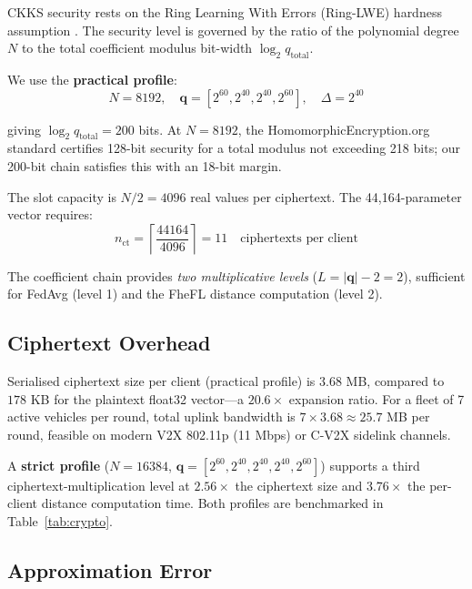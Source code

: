 \documentclass[conference]{IEEEtran}
\begin{document}
CKKS security rests on the Ring Learning With Errors (Ring-LWE) hardness
assumption \cite{lyubashevsky2010ideal}. The security level is governed by
the ratio of the polynomial degree $N$ to the total coefficient modulus
bit-width $\log_2 q_{\mathrm{total}}$.

We use the \textbf{practical profile}:
\begin{equation*}
  N = 8192, \quad
  \mathbf{q} = [2^{60}, 2^{40}, 2^{40}, 2^{60}], \quad
  \Delta = 2^{40}
\end{equation*}

\noindent giving $\log_2 q_{\mathrm{total}} = 200$ bits. At $N{=}8192$, the
HomomorphicEncryption.org standard \cite{hestandard2021} certifies 128-bit
security for a total modulus not exceeding 218 bits; our 200-bit chain
satisfies this with an 18-bit margin.

The slot capacity is $N/2 = 4096$ real values per ciphertext. The
44,164-parameter vector requires:
\begin{equation}
  n_{\mathrm{ct}} = \left\lceil \frac{44164}{4096} \right\rceil = 11
  \quad\text{ciphertexts per client}
\end{equation}

The coefficient chain provides \emph{two multiplicative levels}
($L = |\mathbf{q}| - 2 = 2$), sufficient for FedAvg (level 1) and the
FheFL distance computation (level 2).

\subsection{Ciphertext Overhead}

Serialised ciphertext size per client (practical profile) is
$3.68$ MB, compared to $178$ KB for the plaintext float32 vector---a
$20.6\times$ expansion ratio. For a fleet of 7 active vehicles per round,
total uplink bandwidth is $7 \times 3.68 \approx 25.7$ MB per round,
feasible on modern V2X 802.11p (11 Mbps) or C-V2X sidelink channels.

A \textbf{strict profile} ($N{=}16384$, $\mathbf{q}=[2^{60},2^{40},2^{40},
2^{40},2^{60}]$) supports a third ciphertext-multiplication level at $2.56\times$
the ciphertext size and $3.76\times$ the per-client distance computation
time. Both profiles are benchmarked in Table~\ref{tab:crypto}.

\subsection{Approximation Error}
\end{document}
